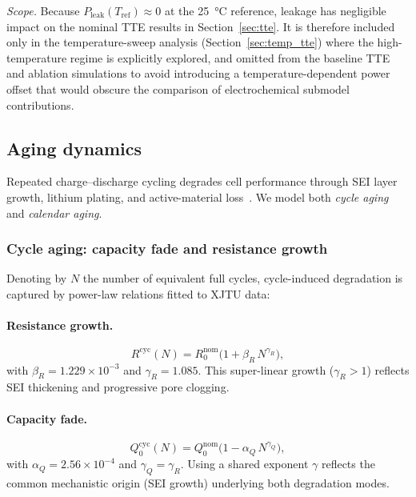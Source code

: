 \documentclass[5p,times,number]{elsarticle}
\newcommand{\secref}[1]{\textcolor{supercolor}{Section~\ref{#1}}}
\begin{document}
\emph{Scope.}
Because $P_{\mathrm{leak}}(T_{\mathrm{ref}}) \approx 0$ at the \SI{25}{\degreeCelsius} reference, leakage has negligible impact on the nominal TTE results in \secref{sec:tte}.
It is therefore included only in the temperature-sweep analysis (\secref{sec:temp_tte}) where the high-temperature regime is explicitly explored, and omitted from the baseline TTE and ablation simulations to avoid introducing a temperature-dependent power offset that would obscure the comparison of electrochemical submodel contributions.

\subsection{Aging dynamics}\label{sec:aging}
Repeated charge--discharge cycling degrades cell performance through SEI layer growth, lithium plating, and active-material loss~\cite{Vetter2005}.
We model both \emph{cycle aging} and \emph{calendar aging}.
\subsubsection{Cycle aging: capacity fade and resistance growth}
Denoting by $N$ the number of equivalent full cycles, cycle-induced degradation is captured by power-law relations fitted to XJTU data:
\paragraph{Resistance growth.}
\begin{equation}\label{eq:Raging}
R^{\mathrm{cyc}}(N) = R_0^{\mathrm{nom}}\bigl(1 + \beta_R\, N^{\gamma_R}\bigr),
\end{equation}
with $\beta_R = 1.229 \times 10^{-3}$ and $\gamma_R = 1.085$.  This super-linear growth ($\gamma_R > 1$) reflects SEI thickening and progressive pore clogging.
\paragraph{Capacity fade.}
\begin{equation}\label{eq:Qaging}
Q_0^{\mathrm{cyc}}(N) = Q_0^{\mathrm{nom}}\bigl(1 - \alpha_Q\, N^{\gamma_Q}\bigr),
\end{equation}
with $\alpha_Q = 2.56 \times 10^{-4}$ and $\gamma_Q = \gamma_R$.  Using a shared exponent $\gamma$ reflects the common mechanistic origin (SEI growth) underlying both degradation modes.
\end{document}
